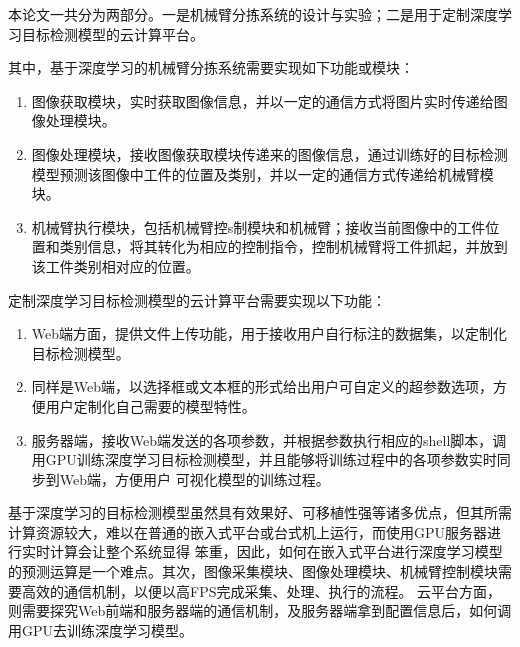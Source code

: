 本论文一共分为两部分。一是机械臂分拣系统的设计与实验；二是用于定制深度学习目标检测模型的云计算平台。

其中，基于深度学习的机械臂分拣系统需要实现如下功能或模块：
\begin{enumerate}
    \item{图像获取模块，实时获取图像信息，并以一定的通信方式将图片实时传递给图像处理模块。}
    \item{图像处理模块，接收图像获取模块传递来的图像信息，通过训练好的目标检测模型预测该图像中工件的位置及类别，并以一定的通信方式传递给机械臂模块。}
    \item{机械臂执行模块，包括机械臂控s制模块和机械臂；接收当前图像中的工件位置和类别信息，将其转化为相应的控制指令，控制机械臂将工件抓起，并放到该工件类别相对应的位置。}
\end{enumerate}

定制深度学习目标检测模型的云计算平台需要实现以下功能：
\begin{enumerate}
    \item{Web端方面，提供文件上传功能，用于接收用户自行标注的数据集，以定制化目标检测模型。}
    \item{同样是Web端，以选择框或文本框的形式给出用户可自定义的超参数选项，方便用户定制化自己需要的模型特性。}
    \item{服务器端，接收Web端发送的各项参数，并根据参数执行相应的shell脚本，调用GPU训练深度学习目标检测模型，并且能够将训练过程中的各项参数实时同步到Web端，方便用户
    可视化模型的训练过程。}
\end{enumerate}

基于深度学习的目标检测模型虽然具有效果好、可移植性强等诸多优点，但其所需计算资源较大，难以在普通的嵌入式平台或台式机上运行，而使用GPU服务器进行实时计算会让整个系统显得
笨重，因此，如何在嵌入式平台进行深度学习模型的预测运算是一个难点。其次，图像采集模块、图像处理模块、机械臂控制模块需要高效的通信机制，以便以高FPS完成采集、处理、执行的流程。
云平台方面，则需要探究Web前端和服务器端的通信机制，及服务器端拿到配置信息后，如何调用GPU去训练深度学习模型。

